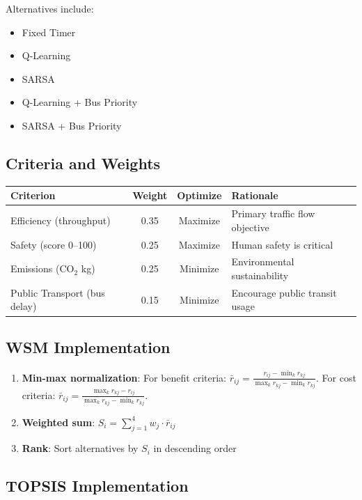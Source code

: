 \documentclass[12pt, a4paper]{article}
\begin{document}
Alternatives include:
\begin{itemize}[nosep]
    \item Fixed Timer
    \item Q-Learning
    \item SARSA
    \item Q-Learning + Bus Priority
    \item SARSA + Bus Priority
\end{itemize}

\subsection{Criteria and Weights}

\begin{center}
\begin{tabular}{lccl}
    \toprule
    \textbf{Criterion} & \textbf{Weight} & \textbf{Optimize} & \textbf{Rationale} \\
    \midrule
    Efficiency (throughput) & 0.35 & Maximize & Primary traffic flow objective \\
    Safety (score 0--100) & 0.25 & Maximize & Human safety is critical \\
    Emissions (CO$_2$ kg) & 0.25 & Minimize & Environmental sustainability \\
    Public Transport (bus delay) & 0.15 & Minimize & Encourage public transit usage \\
    \bottomrule
\end{tabular}
\end{center}

\subsection{WSM Implementation}

\begin{enumerate}[nosep]
    \item \textbf{Min-max normalization}: For benefit criteria: $\bar{r}_{ij} = \frac{r_{ij} - \min_k r_{kj}}{\max_k r_{kj} - \min_k r_{kj}}$. For cost criteria: $\bar{r}_{ij} = \frac{\max_k r_{kj} - r_{ij}}{\max_k r_{kj} - \min_k r_{kj}}$.
    \item \textbf{Weighted sum}: $S_i = \sum_{j=1}^{4} w_j \cdot \bar{r}_{ij}$
    \item \textbf{Rank}: Sort alternatives by $S_i$ in descending order
\end{enumerate}

\subsection{TOPSIS Implementation}
\end{document}

